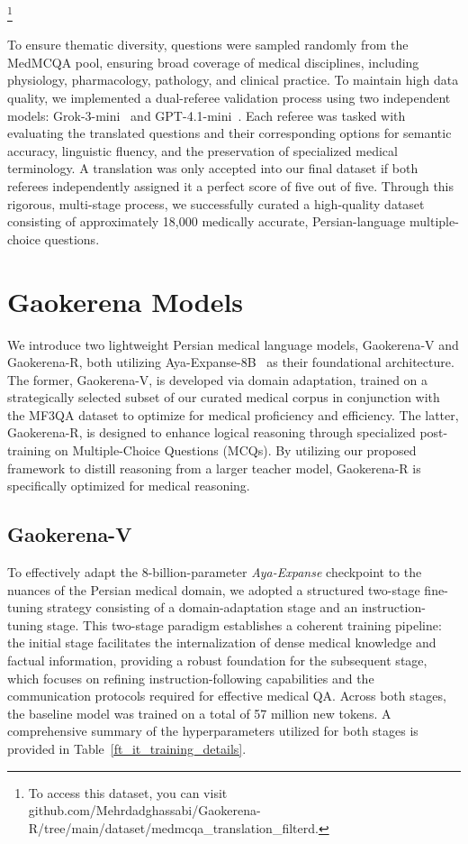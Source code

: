 \documentclass[review]{elsarticle}
\begin{document}
\footnote{To access this dataset, you can visit github.com/Mehrdadghassabi/Gaokerena-R/tree/main/dataset/medmcqa\_translation\_filterd.}

To ensure thematic diversity, questions were sampled randomly from the MedMCQA pool, ensuring broad coverage of medical disciplines, including physiology, pharmacology, pathology, and clinical practice. To maintain high data quality, we implemented a dual-referee validation process using two independent models: Grok-3-mini~\cite{b27} and GPT-4.1-mini~\cite{b28}. Each referee was tasked with evaluating the translated questions and their corresponding options for semantic accuracy, linguistic fluency, and the preservation of specialized medical terminology. A translation was only accepted into our final dataset if both referees independently assigned it a perfect score of five out of five. Through this rigorous, multi-stage process, we successfully curated a high-quality dataset consisting of approximately 18,000 medically accurate, Persian-language multiple-choice questions.

\section{Gaokerena Models}

We introduce two lightweight Persian medical language models, Gaokerena-V and Gaokerena-R, both utilizing Aya-Expanse-8B~\cite{b11,b35} as their foundational architecture. The former, Gaokerena-V, is developed via domain adaptation, trained on a strategically selected subset of our curated medical corpus in conjunction with the MF3QA dataset to optimize for medical proficiency and efficiency. The latter, Gaokerena-R, is designed to enhance logical reasoning through specialized post-training on Multiple-Choice Questions (MCQs). By utilizing our proposed framework to distill reasoning from a larger teacher model, Gaokerena-R is specifically optimized for medical reasoning.

\subsection{Gaokerena-V}

To effectively adapt the 8-billion-parameter \textit{Aya-Expanse} checkpoint to the nuances of the Persian medical domain, we adopted a structured two-stage fine-tuning strategy consisting of a domain-adaptation stage and an instruction-tuning stage. This two-stage paradigm establishes a coherent training pipeline: the initial stage facilitates the internalization of dense medical knowledge and factual information, providing a robust foundation for the subsequent stage, which focuses on refining instruction-following capabilities and the communication protocols required for effective medical QA. Across both stages, the baseline model was trained on a total of 57 million new tokens. A comprehensive summary of the hyperparameters utilized for both stages is provided in Table~\ref{ft_it_training_details}.
\end{document}
